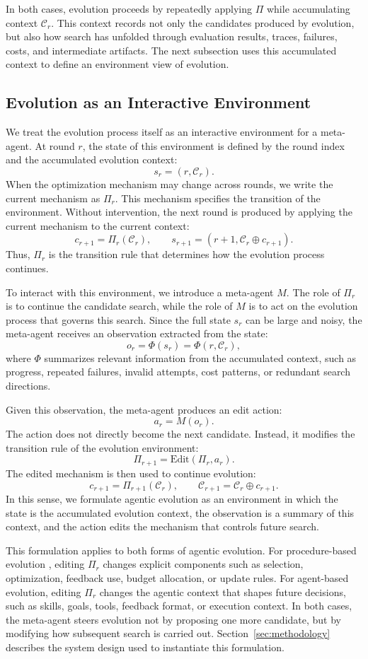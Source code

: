 In both cases, evolution proceeds by repeatedly applying $\Pi$ while accumulating context $\mathcal{C}_r$. 
This context records not only the candidates produced by evolution, but also how search has unfolded through evaluation results, traces, failures, costs, and intermediate artifacts. 
The next subsection uses this accumulated context to define an environment view of evolution.

\subsection{Evolution as an Interactive Environment}
\label{sec:evolution_as_environment}

We treat the evolution process itself as an interactive environment for a meta-agent. 
At round $r$, the state of this environment is defined by the round index and the accumulated evolution context:
\[
s_r = (r, \mathcal{C}_r).
\]
When the optimization mechanism may change across rounds, we write the current mechanism as $\Pi_r$. 
This mechanism specifies the transition of the environment. 
Without intervention, the next round is produced by applying the current mechanism to the current context:
\[
c_{r+1} = \Pi_r(\mathcal{C}_r),
\qquad
s_{r+1} = (r+1, \mathcal{C}_r \oplus c_{r+1}).
\]
Thus, $\Pi_r$ is the transition rule that determines how the evolution process continues.

To interact with this environment, we introduce a meta-agent $M$. 
The role of $\Pi_r$ is to continue the candidate search, while the role of $M$ is to act on the evolution process that governs this search. 
Since the full state $s_r$ can be large and noisy, the meta-agent receives an observation extracted from the state:
\[
o_r = \Phi(s_r) = \Phi(r, \mathcal{C}_r),
\]
where $\Phi$ summarizes relevant information from the accumulated context, such as progress, repeated failures, invalid attempts, cost patterns, or redundant search directions.

Given this observation, the meta-agent produces an edit action:
\[
a_r = M(o_r).
\]
The action does not directly become the next candidate. 
Instead, it modifies the transition rule of the evolution environment:
\[
\Pi_{r+1} = \mathrm{Edit}(\Pi_r, a_r).
\]
The edited mechanism is then used to continue evolution:
\[
c_{r+1} = \Pi_{r+1}(\mathcal{C}_r),
\qquad
\mathcal{C}_{r+1} = \mathcal{C}_r \oplus c_{r+1}.
\]
In this sense, we formulate agentic evolution as an environment in which the state is the accumulated evolution context, the observation is a summary of this context, and the action edits the mechanism that controls future search.

This formulation applies to both forms of agentic evolution. 
For procedure-based evolution , editing $\Pi_r$ changes explicit components such as selection, optimization, feedback use, budget allocation, or update rules. 
For agent-based evolution, editing $\Pi_r$ changes the agentic context that shapes future decisions, such as skills, goals, tools, feedback format, or execution context. 
In both cases, the meta-agent steers evolution not by proposing one more candidate, but by modifying how subsequent search is carried out. 
Section~\ref{sec:methodology} describes the system design used to instantiate this formulation.
